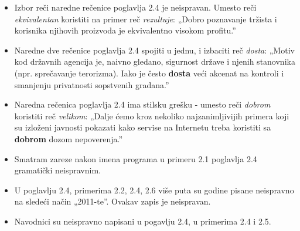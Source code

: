 \documentclass[a4paper]{report}
\newcommand{\odgovor}[1]{\textcolor{blue}{#1}}
\begin{document}
\begin{itemize}
    \item Izbor reči naredne rečenice poglavlja 2.4 je neispravan. Umesto reči  \textit{ekvivalentan} koristiti na primer reč \textit{rezultuje}:\newline
    „Dobro poznavanje tržista i korisnika njihovih proizvoda je ekvivalentno visokom profitu.”
    
    \odgovor{}
        
\end{itemize}
\begin{itemize}
    \item Naredne dve rečenice poglavlja 2.4 spojiti u jednu, i izbaciti reč  \textit{dosta}: \newline
    „Motiv kod državnih agencija je, naivno gledano, sigurnost države i njenih stanovnika (npr. sprečavanje terorizma). Iako je često  \textbf{dosta} veći akcenat na kontroli i smanjenju privatnosti sopstvenih gradana.”
    
    \odgovor{}
    
\end{itemize}
\begin{itemize}
    \item Naredna rečenica poglavlja 2.4 ima stilsku grešku - umesto reči \textit{dobrom} koristiti reč \textit{velikom}: \newline
    „Dalje ćemo kroz nekoliko najzanimljivijih primera koji su izloženi javnosti pokazati kako servise na Internetu treba koristiti sa \textbf{dobrom} dozom nepoverenja.”
    
    \odgovor{}
    
\end{itemize}
\begin{itemize}
    \item Smatram zareze nakon imena programa u primeru 2.1 poglavlja 2.4 gramatički neispravnim. 
    
    \odgovor{}
    
\end{itemize}
\begin{itemize}
    \item  U poglavlju 2.4, primerima 2.2, 2.4, 2.6 više puta su godine pisane neispravno na sledeći način „2011-te”. Ovakav zapis je neispravan.
    
    \odgovor{}
    
\end{itemize}
\begin{itemize}
    \item  Navodnici su neispravno napisani u pogavlju 2.4, u primerima 2.4 i 2.5.
    
    \odgovor{}
    
\end{itemize}
\end{document}
